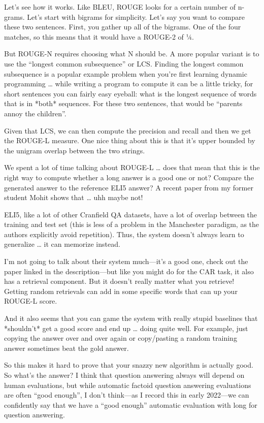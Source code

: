 Let’s see how it works.   Like BLEU, ROUGE looks for a certain number of n-grams.  Let’s start with bigrams for simplicity.  Let’s say you want to compare these two sentences.  First, you gather up all of the bigrams.  One of the four matches, so this means that it would have a ROUGE-2 of ¼.  

But ROUGE-N requires choosing what N should be.  A more popular variant is to use the “longest common subsequence” or LCS.  Finding the longest common subsequence is a popular example problem when you’re first learning dynamic programming … while writing a program to compute it can be a little tricky, for short sentences you can fairly easy eyeball: what is the longest sequence of words that is in *both* sequences.  For these two sentences, that would be “parents annoy the children”.  

Given that LCS, we can then compute the precision and recall and then we get the ROUGE-L measure.  One nice thing about this is that it’s upper bounded by the unigram overlap between the two strings.

We spent a lot of time talking about ROUGE-L … does that mean that this is the right way to compute whether a long answer is a good one or not?  Compare the generated answer to the reference ELI5 answer?  A recent paper from my former student Mohit shows that … uhh maybe not!

ELI5, like a lot of other Cranfield QA datasets, have a lot of overlap between the training and test set (this is less of a problem in the Manchester paradigm, as the authors explicitly avoid repetition).  Thus, the system doesn’t always learn to generalize … it can memorize instead.

I’m not going to talk about their system much—it’s a good one, check out the paper linked in the description—but like you might do for the CAR task, it also has a retrieval component.  But it doesn’t really matter what you retrieve!  Getting random retrievals can add in some specific words that can up your ROUGE-L score.

And it also seems that you can game the system with really stupid baselines that *shouldn’t* get a good score and end up … doing quite well.  For example, just copying the answer over and over again or copy/pasting a random training answer sometimes beat the gold answer.

So this makes it hard to prove that your snazzy new algorithm is actually good.  So what’s the answer?  I think that question answering always will depend on human evaluations, but while automatic factoid question answering evaluations are often “good enough”, I don’t think—as I record this in early 2022—we can confidently say that we have a “good enough” automatic evaluation with long for question answering.

